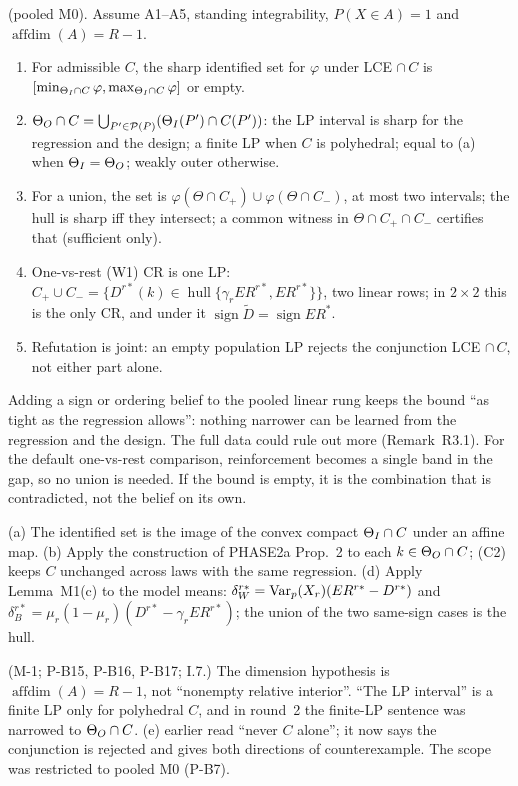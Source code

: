\begin{result}\label{res:r3}
 (pooled M0). Assume A1--A5, standing
integrability, $P(X\in A)=1$ and $\operatorname{affdim}(A)=R-1$.
\begin{enumerate}[label=(\alph*),nosep]
\item For admissible $C$, the sharp identified set for $\varphi$ under LCE $\cap\,C$
is $[\min_{\Theta_I\cap C}\varphi,\max_{\Theta_I\cap C}\varphi]$ or empty.
\item $\Theta_O\cap C=\bigcup_{P'\in\mathcal P(P)}(\Theta_I(P')\cap C(P'))$: the LP
interval is sharp for the regression and the design; a finite LP when $C$ is
polyhedral; equal to (a) when $\Theta_I=\Theta_O$; weakly outer otherwise.
\item For a union, the set is $\varphi(\Theta\cap C_+)\cup\varphi(\Theta\cap C_-)$,
at most two intervals; the hull is sharp iff they intersect; a common witness in
$\Theta\cap C_+\cap C_-$ certifies that (sufficient only).
\item One-vs-rest (W1) CR is one LP: $C_+\cup C_-=\{D^{r*}(k)\in\operatorname{hull}\{\gamma_rER^{r*},ER^{r*}\}\}$,
two linear rows; in $2\times2$ this is the only CR, and under it
$\operatorname{sign}\tilde D=\operatorname{sign}ER^*$.
\item Refutation is joint: an empty population LP rejects the conjunction LCE
$\cap\,C$, not either part alone.
\end{enumerate}
\end{result}
\begin{plain}
Adding a sign or ordering belief to the pooled linear rung keeps the bound
``as tight as the regression allows'': nothing narrower can be learned from the
regression and the design. The full data could rule out more (Remark~R3.1). For
the default one-vs-rest comparison, reinforcement becomes a single band in the
gap, so no union is needed. If the bound is empty, it is the combination that is
contradicted, not the belief on its own.
\end{plain}
\begin{sketch}
(a) The identified set is the image of the convex compact $\Theta_I\cap C$ under an
affine map. (b) Apply the construction of PHASE2a Prop.~2 to each $k\in\Theta_O\cap
C$; (C2) keeps $C$ unchanged across laws with the same regression. (d) Apply
Lemma~M1(c) to the model means: $\delta^{r*}_W=\operatorname{Var}_p(X_r)(ER^{r*}-D^{r*})$ and
$\delta^{r*}_B=\mu_r(1-\mu_r)(D^{r*}-\gamma_rER^{r*})$; the union of the two
same-sign cases is the hull.
\end{sketch}
\begin{revnote}
(M-1; P-B15, P-B16, P-B17; I.7.) The dimension hypothesis is
$\operatorname{affdim}(A)=R-1$, not ``nonempty relative interior''. ``The LP
interval'' is a finite LP only for polyhedral $C$, and in round~2 the
finite-LP sentence was narrowed to $\Theta_O\cap C$. (e) earlier read ``never $C$
alone''; it now says the conjunction is rejected and gives both directions of
counterexample. The scope was restricted to pooled M0 (P-B7).
\end{revnote}

